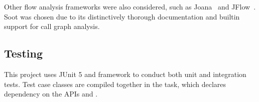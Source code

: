 Other flow analysis frameworks were also considered,
such as Joana~\cite{joana} and JFlow~\cite{jflow}.
Soot was chosen due to its distinctively thorough documentation
and builtin support for call graph analysis.

\subsection{Testing}\label{subsec:testing}
This project uses JUnit 5 and  framework
to conduct both unit and integration tests.
Test case classes are compiled together in the  task,
which declares dependency on the APIs  and .
